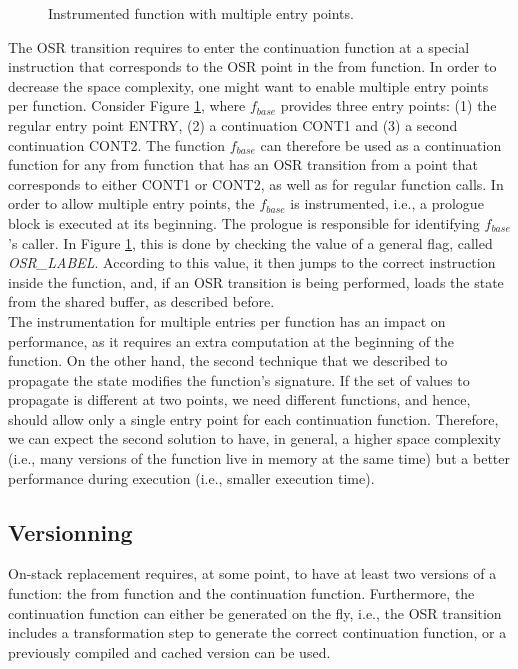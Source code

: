 \begin{figure}[h!]
\centering
\begin{subfigure}{.8\textwidth}
\end{subfigure}
\caption{Instrumented function with multiple entry points.}
\label{fig:multipleentry}
\end{figure}

The OSR transition requires to enter the continuation function at a special instruction that corresponds to the OSR point in the from function.
In order to decrease the space complexity, one might want to enable multiple entry points per function.
Consider Figure \ref{fig:multipleentry}, where $f_{base}$ provides three entry points: (1) the regular entry point ENTRY, (2) a continuation CONT1 and (3) a second continuation CONT2.
The function $f_{base}$ can therefore be used as a continuation function for any from function that has an OSR transition from a point that corresponds to either CONT1 or CONT2, as well as for regular function calls.
In order to allow multiple entry points, the $f_{base}$ is instrumented, i.e., a prologue block is executed at its beginning.
The prologue is responsible for identifying $f_{base}$'s caller. 
In Figure \ref{fig:multipleentry}, this is done by checking the value of a general flag, called \textit{OSR\_LABEL}.
According to this value, it then jumps to the correct instruction inside the function, and, if an OSR transition is being performed, loads the state from the shared buffer, as described before.\\

The instrumentation for multiple entries per function has an impact on performance, as it requires an extra computation at the beginning of the function. 
On the other hand, the second technique that we described to propagate the state modifies the function's signature.
If the set of values to propagate is different at two points, we need different functions, and hence, should allow only a single entry point for each continuation function.
Therefore, we can expect the second solution to have, in general, a higher space complexity (i.e., many versions of the function live in memory at the same time) but a better performance during execution (i.e., smaller execution time).\\

\subsection{Versionning}
On-stack replacement requires, at some point, to have at least two versions of a function: the from function and the continuation function.
Furthermore, the continuation function can either be generated on the fly, i.e., the OSR transition includes a transformation step to generate the correct continuation function, or a previously compiled and cached version can be used.

